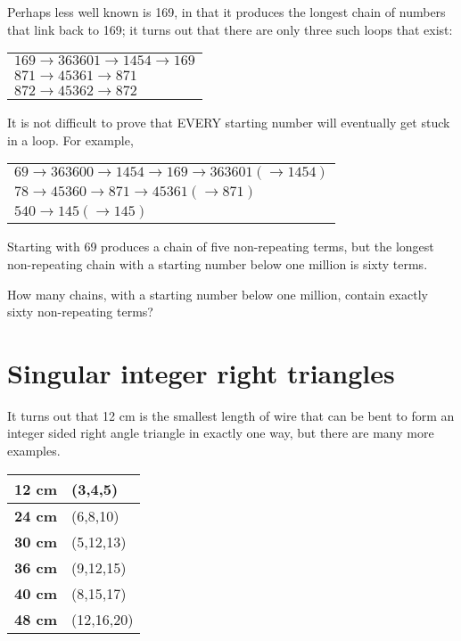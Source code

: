 Perhaps less well known is 169, in that it produces the longest chain of numbers that link back to 169; it turns out that there are only three such loops that exist:

\begin{center}
    \begin{tabular}{l}
        $169 \rightarrow 363601 \rightarrow 1454 \rightarrow 169$\\
        $871 \rightarrow 45361 \rightarrow 871$\\
        $872 \rightarrow 45362 \rightarrow 872$\\
    \end{tabular}
\end{center}

It is not difficult to prove that EVERY starting number will eventually get stuck in a loop. For example,

\begin{center}
    \begin{tabular}{l}
        $69 \rightarrow 363600 \rightarrow 1454 \rightarrow 169 \rightarrow 363601 (\rightarrow 1454)$\\
        $78 \rightarrow 45360 \rightarrow 871 \rightarrow 45361 (\rightarrow 871)$\\
        $540 \rightarrow 145 (\rightarrow 145)$\\
    \end{tabular}
\end{center}


Starting with 69 produces a chain of five non-repeating terms, but the longest non-repeating chain with a starting number below one million is sixty terms.

How many chains, with a starting number below one million, contain exactly sixty non-repeating terms?


\section{Singular integer right triangles} \label{pb.075}

It turns out that 12 cm is the smallest length of wire that can be bent to form an integer sided right angle triangle in exactly one way, but there are many more examples.

\begin{center}
    \begin{tabular}{|l|l|}
        \hline
        \textbf{12 cm} & (3,4,5)\\
        \hline
        \textbf{24 cm} & (6,8,10)\\
        \hline
        \textbf{30 cm} & (5,12,13)\\
        \hline
        \textbf{36 cm} & (9,12,15)\\
        \hline
        \textbf{40 cm} & (8,15,17)\\
        \hline
        \textbf{48 cm} & (12,16,20)\\
        \hline
    \end{tabular}
\end{center}

